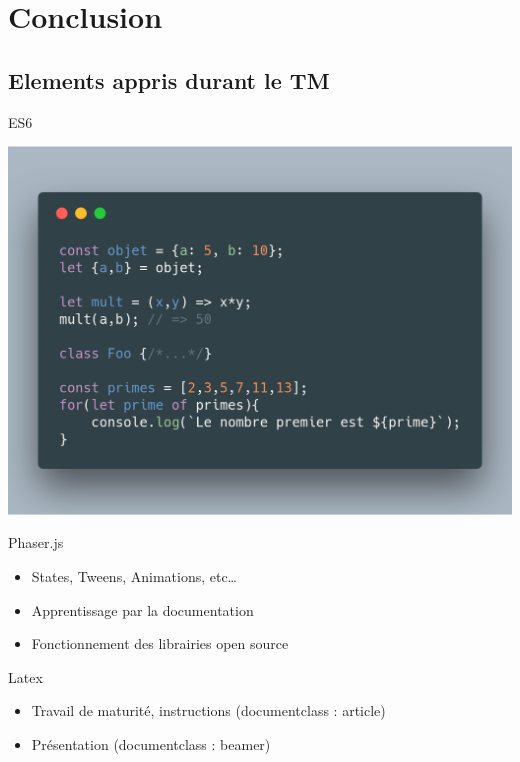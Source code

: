\documentclass[11pt]{beamer}
\newcommand{\pauseditemize}{\pause \begin{itemize}[<+->]}
\begin{document}
\section{Conclusion}
\subsection{Elements appris durant le TM}

\begin{frame}{ES6}

\begin{center}
	\includegraphics[scale=.2]{../images/es6}
\end{center}

\end{frame}

\begin{frame}{Phaser.js}

\pauseditemize
	\item States, Tweens, Animations, etc\dots
	\item Apprentissage par la documentation
	\item Fonctionnement des librairies open source
\end{itemize}

\end{frame}

\begin{frame}{Latex}
	
\pauseditemize
	\item Travail de maturité, instructions (documentclass : article)
	\item Présentation (documentclass : beamer)
\end{itemize}

\end{frame}
\end{document}
